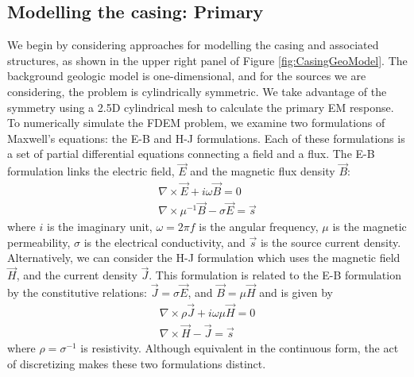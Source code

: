 \documentclass{segabs}
\newcommand{\curl}{\ensuremath{\nabla \times}}
\begin{document}
\subsection{Modelling the casing: Primary}
We begin by considering approaches for modelling the casing and associated structures, as shown in the upper right panel of Figure \ref{fig:CasingGeoModel}. The background geologic model is one-dimensional, and for the sources we are considering, the problem is cylindrically symmetric. We take advantage of the symmetry using a 2.5D cylindrical mesh to calculate the primary EM response. To numerically simulate the FDEM problem, we examine two formulations of Maxwell's equations: the E-B and H-J formulations. Each of these formulations is a set of partial differential equations connecting a field and a flux. The E-B formulation links the electric field, $\vec{E}$ and the magnetic flux density $\vec{B}$:
\begin{equation}
	\begin{split}
		\curl \vec{E} + i \omega \vec{B} = 0 \\
		\curl \mu^{-1} \vec{B} - \sigma \vec{E} = \vec{s}
	\end{split}
	\label{eq:maxwellEB}
\end{equation}
where $i$ is the imaginary unit, $\omega = 2\pi f$ is the angular frequency, $\mu$ is the magnetic permeability, $\sigma$ is the electrical conductivity, and $\vec{s}$ is the source current density. Alternatively, we can consider the H-J formulation which uses the magnetic field $\vec{H}$, and the current density $\vec{J}$. This formulation is related to the E-B formulation by the constitutive relations: $\vec{J} = \sigma \vec{E}$, and $\vec{B} = \mu \vec{H}$ and is given by
\begin{equation}
	\begin{split}
		\curl \rho \vec{J} + i \omega \mu \vec{H} = 0 \\
		\curl \vec{H} - \vec{J} = \vec{s}
	\end{split}
	\label{eq:maxwellHJ}
\end{equation} 
where $\rho = \sigma^{-1}$ is resistivity. Although equivalent in the continuous form, the act of discretizing makes these two formulations distinct. 
\end{document}
